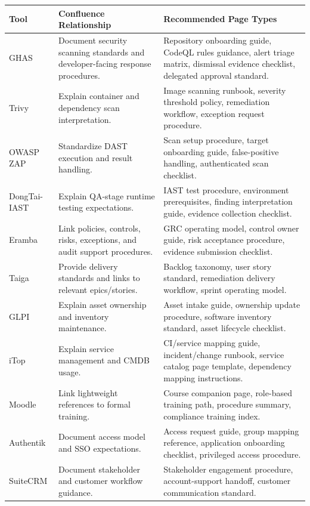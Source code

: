 \documentclass[10pt,letterpaper]{article}
\begin{document}
\begin{longtable}{L{1.2in} L{2.1in} L{3.45in}}
\toprule
\textbf{Tool} & \textbf{Confluence Relationship} & \textbf{Recommended Page Types} \\
\midrule
GHAS & Document security scanning standards and developer-facing response procedures. & Repository onboarding guide, CodeQL rules guidance, alert triage matrix, dismissal evidence checklist, delegated approval standard. \\
Trivy & Explain container and dependency scan interpretation. & Image scanning runbook, severity threshold policy, remediation workflow, exception request procedure. \\
OWASP ZAP & Standardize DAST execution and result handling. & Scan setup procedure, target onboarding guide, false-positive handling, authenticated scan checklist. \\
DongTai-IAST & Explain QA-stage runtime testing expectations. & IAST test procedure, environment prerequisites, finding interpretation guide, evidence collection checklist. \\
Eramba & Link policies, controls, risks, exceptions, and audit support procedures. & GRC operating model, control owner guide, risk acceptance procedure, evidence submission checklist. \\
Taiga & Provide delivery standards and links to relevant epics/stories. & Backlog taxonomy, user story standard, remediation delivery workflow, sprint operating model. \\
GLPI & Explain asset ownership and inventory maintenance. & Asset intake guide, ownership update procedure, software inventory standard, asset lifecycle checklist. \\
iTop & Explain service management and CMDB usage. & CI/service mapping guide, incident/change runbook, service catalog page template, dependency mapping instructions. \\
Moodle & Link lightweight references to formal training. & Course companion page, role-based training path, procedure summary, compliance training index. \\
Authentik & Document access model and SSO expectations. & Access request guide, group mapping reference, application onboarding checklist, privileged access procedure. \\
SuiteCRM & Document stakeholder and customer workflow guidance. & Stakeholder engagement procedure, account-support handoff, customer communication standard. \\
\bottomrule
\end{longtable}
\end{document}
